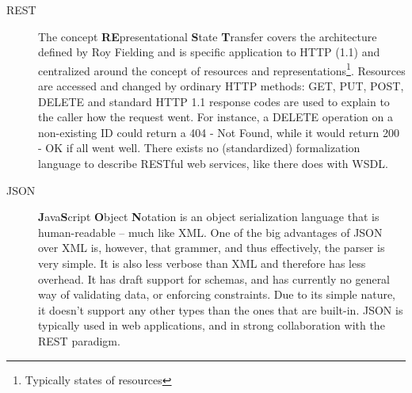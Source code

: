 \begin{description}

\item[REST] The concept \textbf{RE}presentational \textbf{S}tate \textbf{T}ransfer covers the architecture defined by Roy Fielding and is specific application to HTTP (1.1) and centralized around the concept of resources and representations\footnote{Typically states of resources}. Resources are accessed and changed by ordinary HTTP methods: GET, PUT, POST, DELETE and standard HTTP 1.1 response codes are used to explain to the caller how the request went. For instance, a DELETE operation on a non-existing ID could return a 404 - Not Found, while it would return 200 - OK if all went well. There exists no (standardized) formalization language to describe RESTful web services, like there does with WSDL.

\item[JSON] \textbf{J}ava\textbf{S}cript \textbf{O}bject \textbf{N}otation is an object serialization language that is human-readable -- much like XML. One of the big advantages of JSON over XML is, however, that grammer, and thus effectively, the parser is very simple. It is also less verbose than XML and therefore has less overhead. It has draft support for schemas, and has currently no general way of validating data, or enforcing constraints. Due to its simple nature, it doesn't support any other types than the ones that are built-in. JSON is typically used in web applications, and in strong collaboration with the REST paradigm.

\end{description}